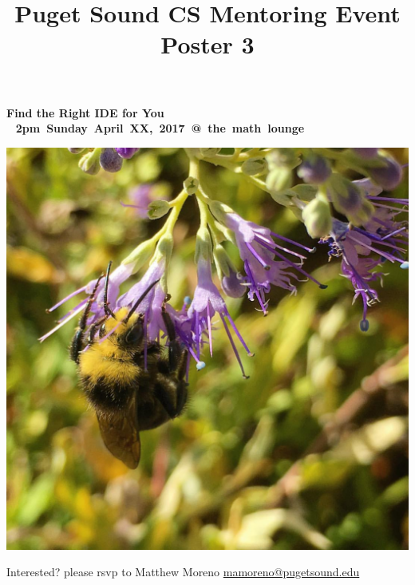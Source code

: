 \documentclass[12pt,letterpaper]{article}
\title{Puget Sound CS Mentoring Event Poster 3}
\begin{document}
{\fontsize{40pt}{42pt}\bfseries\selectfont\color{HighlightColor}%
Find the Right IDE for You\\
}%
~\hfill
{\LARGE\bfseries%
\mbox{2pm Sunday April XX, 2017 @ the math lounge}%
}


%

{\centering%
\includegraphics[width=0.93\linewidth]{bee}%
\par}


\vspace{-3ex}
\begin{large}
\justify
{ \par}

\end{large}



{\LARGE Interested?}
\hfill
{\Large please rsvp to Matthew Moreno \url{mamoreno@pugetsound.edu}}
\end{document}

